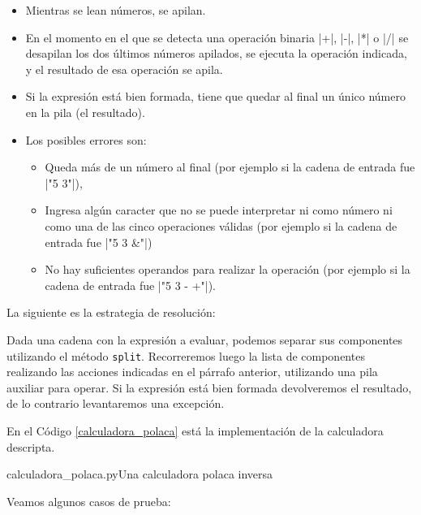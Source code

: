 \begin{itemize}
\item Mientras se lean números, se apilan.

\item En el momento en el que se detecta una operación binaria |+|,
|-|, |*| o |/| se desapilan los dos últimos
números apilados, se ejecuta la operación indicada, y el resultado de esa
operación se apila.

\item Si la expresión está bien formada, tiene que quedar al final un único
número en la pila (el resultado).

\item Los posibles errores son:

\begin{itemize}
\item Queda más de un número al final (por ejemplo si la cadena de entrada
fue |"5 3"|),

\item Ingresa algún caracter que no se puede interpretar ni como número ni como
una de las cinco operaciones válidas (por ejemplo si la cadena de entrada
fue |"5 3 &"|)

\item No hay suficientes operandos para realizar la operación (por ejemplo
si la cadena de entrada fue |"5 3 - +"|).
\end{itemize}
\end{itemize}

La siguiente es la estrategia de resolución:

Dada una cadena con la expresión a evaluar, podemos separar sus componentes
utilizando el método \lstinline!split!.  Recorreremos luego la lista de
componentes realizando las acciones indicadas en el párrafo anterior,
utilizando una pila auxiliar para operar. Si la expresión está bien formada
devolveremos el resultado, de lo contrario levantaremos una excepción.

En el Código \ref{calculadora_polaca} está la implementación de la
calculadora descripta.

\begin{codigo}{\label{calculadora_polaca} calculadora\_polaca.py}{Una calculadora polaca inversa}

\end{codigo}

Veamos algunos casos de prueba:

